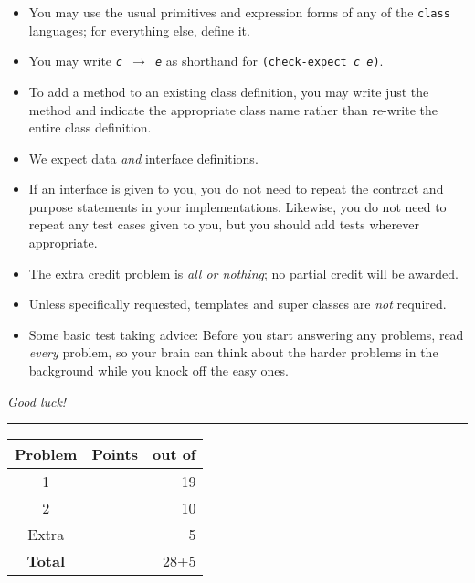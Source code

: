 \documentclass[12pt]{article}                   %
\newcommand\code[1]{\texttt{#1}}
\begin{document}
\noindent\begin{minipage}{8cm}\sloppy
\begin{itemize}
\item You may use the usual primitives and expression forms of any of
  the \code{class} languages; for everything else, define it.

\item You may write {\tt {\slshape c} $\rightarrow$ {\slshape e}} as
  shorthand for
  {\tt (check-expect {\slshape c e})}.

\item To add a method to an existing class definition, you
  may write just the method and indicate the appropriate class name
  rather than re-write the entire class definition.

\item We expect data \emph{and} interface definitions.

\item If an interface is given to you, you do not need to repeat the
  contract and purpose statements in your implementations.  Likewise,
  you do not need to repeat any test cases given to you, but you
  should add tests wherever appropriate.


\item The extra credit problem is \emph{all or nothing};  no partial
  credit will be awarded.

\item Unless specifically requested, templates and super classes are
  \emph{not} required.

\item Some basic test taking advice: Before you start answering
any problems, read \emph{every} problem, so your brain can  think
about the harder problems in the background while you knock off the easy ones.
\end{itemize}

\bigskip

\emph{Good luck!}
\end{minipage}\hfil\begin{minipage}[t]{6cm}
\rule{1cm}{0pt}\begin{tabular}{|c|l|@{/}r|}
\hline
{\bf Problem} & Points & out of \\ \hline
1 & & 19\\ \hline
2 & & 10\\ \hline
Extra & & 5 \\ \hline
{\bf Total} & & 28+5 \\ \hline
\end{tabular}
\end{minipage}
\end{document}
